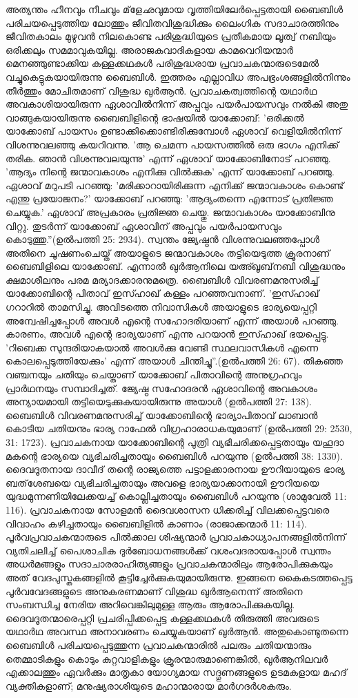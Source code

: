 അത്യന്തം ഹീനവും നീചവും മ്‌ളേഛവുമായ വൃത്തിയിലേര്‍പ്പെട്ടതായി ബൈബിള്‍ പരിചയപ്പെടുത്തിയ ലോത്തും ജീവിതവിശുദ്ധിക്കും ലൈംഗിക സദാചാരത്തിനും ജീവിതകാലം മുഴുവന്‍ നിലകൊണ്ട പരിശുദ്ധിയുടെ പ്രതീകമായ ലൂത്വ് നബിയും ഒരിക്കലും സമമാവുകയില്ല. അരാജകവാദികളായ കാമവെറിയന്മാര്‍ മെനഞ്ഞുണ്ടാക്കിയ കള്ളക്കഥകള്‍ പരിശുദ്ധരായ പ്രവാചകന്മാരുടെമേല്‍ വച്ചുകെട്ടുകയായിരുന്നു ബൈബിള്‍. ഇത്തരം എല്ലാവിധ അപഭ്രംശങ്ങളില്‍നിന്നും തീര്‍ത്തും മോചിതമാണ് വിശുദ്ധ ഖുര്‍ആന്‍.
പ്രവാചകത്വത്തിന്റെ യഥാര്‍ഥ അവകാശിയായിരുന്ന ഏശാവില്‍നിന്ന് അപ്പവും പയര്‍പായസവും നല്‍കി അതു വാങ്ങുകയായിരുന്നു ബൈബിളിന്റെ ഭാഷയില്‍ യാക്കോബ്: 'ഒരിക്കല്‍ യാക്കോബ് പായസം ഉണ്ടാക്കിക്കൊണ്ടിരിക്കുമ്പോള്‍ ഏശാവ് വെളിയില്‍നിന്ന് വിശന്നുവലഞ്ഞു കയറിവന്നു. 'ആ ചെമന്ന പായസത്തില്‍ ഒരു ഭാഗം എനിക്ക് തരിക. ഞാന്‍ വിശന്നുവലയുന്നു' എന്ന് ഏശാവ് യാക്കോബിനോട് പറഞ്ഞു. 'ആദ്യം നിന്റെ ജന്മാവകാശം എനിക്കു വില്‍ക്കുക' എന്ന് യാക്കോബ് പറഞ്ഞു. ഏശാവ് മറുപടി പറഞ്ഞു: 'മരിക്കാറായിരിക്കുന്ന എനിക്ക് ജന്മാവകാശം കൊണ്ട് എന്തു പ്രയോജനം?' യാക്കോബ് പറഞ്ഞു: 'ആദ്യംതന്നെ എന്നോട് പ്രതിജ്ഞ ചെയ്യുക.' ഏശാവ് അപ്രകാരം പ്രതിജ്ഞ ചെയ്തു. ജന്മാവകാശം യാക്കോബിനു വിറ്റു. തുടര്‍ന്ന് യാക്കോബ് ഏശാവിന് അപ്പവും പയര്‍പായസവും കൊടുത്തു.''(ഉല്‍പത്തി 25: 2934).
സ്വന്തം ജ്യേഷ്ഠന്‍ വിശന്നുവലഞ്ഞപ്പോള്‍ അതിനെ ചൂഷണംചെയ്ത് അയാളുടെ ജന്മാവകാശം തട്ടിയെടുത്ത ക്രൂരനാണ് ബൈബിളിലെ യാക്കോബ്. എന്നാല്‍ ഖുര്‍ആനിലെ യഅ്ഖൂബ്‌നബി വിശുദ്ധനും ക്ഷമാശീലനും പരമ മര്യാദക്കാരനുമത്രെ. ബൈബിള്‍ വിവരണമനുസരിച്ച് യാക്കോബിന്റെ പിതാവ് ഇസ്ഹാഖ് കള്ളം പറഞ്ഞവനാണ്. 'ഇസ്ഹാഖ് ഗറാറില്‍ താമസിച്ചു. അവിടത്തെ നിവാസികള്‍ അയാളുടെ ഭാര്യയെപ്പറ്റി അന്വേഷിച്ചപ്പോള്‍ അവള്‍ എന്റെ സഹോദരിയാണ് എന്ന് അയാള്‍ പറഞ്ഞു. കാരണം, അവള്‍ എന്റെ ഭാര്യയാണ് എന്നു പറയാന്‍ ഇസ്ഹാഖ് ഭയപ്പെട്ടു. 'റിബെക്ക സുന്ദരിയാകയാല്‍ അവള്‍ക്കു വേണ്ടി സ്ഥലവാസികള്‍ എന്നെ കൊലപ്പെടുത്തിയേക്കും' എന്ന് അയാള്‍ ചിന്തിച്ചു''.(ഉല്‍പത്തി 26: 67).
തികഞ്ഞ വഞ്ചനയും ചതിയും ചെയ്താണ് യാക്കോബ് പിതാവിന്റെ അനുഗ്രഹവും പ്രാര്‍ഥനയും സമ്പാദിച്ചത്. ജ്യേഷ്ഠ സഹോദരന്‍ ഏശാവിന്റെ അവകാശം അന്യായമായി തട്ടിയെടുക്കുകയായിരുന്നു അയാള്‍ (ഉല്‍പത്തി 27: 138).
ബൈബിള്‍ വിവരണമനുസരിച്ച് യാക്കോബിന്റെ ഭാര്യാപിതാവ് ലാബാന്‍ കൊടിയ ചതിയനും ഭാര്യ റാഫേല്‍ വിഗ്രഹാരാധകയുമാണ് (ഉല്‍പത്തി 29: 2530, 31: 1723). പ്രവാചകനായ യാക്കോബിന്റെ പുത്രി വ്യഭിചരിക്കപ്പെട്ടതായും യഹൂദാ മകന്റെ ഭാര്യയെ വ്യഭിചരിച്ചതായും ബൈബിള്‍ പറയുന്നു (ഉല്‍പത്തി 38: 1330).
ദൈവദൂതനായ ദാവീദ് തന്റെ രാജ്യത്തെ പട്ടാളക്കാരനായ ഊറിയായുടെ ഭാര്യ ബത്‌ശേബയെ വ്യഭിചരിച്ചതായും അവളെ ഭാര്യയാക്കാനായി ഊറിയയെ യുദ്ധമുന്നണിയിലേക്കയച്ച് കൊല്ലിച്ചതായും ബൈബിള്‍ പറയുന്നു (ശാമുവേല്‍ 11: 116). പ്രവാചകനായ സോളമന്‍ ദൈവശാസന ധിക്കരിച്ച് വിലക്കപ്പെട്ടവരെ വിവാഹം കഴിച്ചതായും ബൈബിളില്‍ കാണാം (രാജാക്കന്മാര്‍ 11: 114).
പൂര്‍വപ്രവാചകന്മാരുടെ പില്‍ക്കാല ശിഷ്യന്മാര്‍ പ്രവാചകാധ്യാപനങ്ങളില്‍നിന്ന് വ്യതിചലിച്ച് പൈശാചിക ദുര്‍ബോധനങ്ങള്‍ക്ക് വശംവദരായപ്പോള്‍ സ്വന്തം അധര്‍മങ്ങളും സദാചാരരാഹിത്യങ്ങളും പ്രവാചകന്മാരിലും ആരോപിക്കുകയും അത് വേദപുസ്തകങ്ങളില്‍ കൂട്ടിച്ചേര്‍ക്കുകയുമായിരുന്നു. ഇങ്ങനെ കൈകടത്തപ്പെട്ട പൂര്‍വവേദങ്ങളുടെ അനുകരണമാണ് വിശുദ്ധ ഖുര്‍ആനെന്ന് അതിനെ സംബന്ധിച്ച നേരിയ അറിവെങ്കിലുമുള്ള ആരും ആരോപിക്കുകയില്ല. ദൈവദൂതന്മാരെപ്പറ്റി പ്രചരിപ്പിക്കപ്പെട്ട കള്ളക്കഥകള്‍ തിരുത്തി അവരുടെ യഥാര്‍ഥ അവസ്ഥ അനാവരണം ചെയ്യുകയാണ് ഖുര്‍ആന്‍. അതുകൊണ്ടുതന്നെ ബൈബിള്‍ പരിചയപ്പെടുത്തുന്ന പ്രവാചകന്മാരില്‍ പലരും ചതിയന്മാരും തെമ്മാടികളും കൊടും കുറ്റവാളികളും ക്രൂരന്മാരുമാണെങ്കില്‍, ഖുര്‍ആനിലവര്‍ എക്കാലത്തും ഏവര്‍ക്കും മാതൃകാ യോഗ്യമായ സദ്ഗുണങ്ങളുടെ ഉടമകളായ മഹദ് വ്യക്തികളാണ്; മനുഷ്യരാശിയുടെ മഹാന്മാരായ മാര്‍ഗദര്‍ശകരും.

